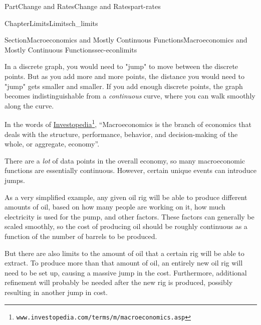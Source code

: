\documentclass[oneside,10pt,]{tufte-book}
\numberwithin{equation}{chapter}
\begin{document}
\begin{partptx}{Part}{Change and Rates}{}{Change and Rates}{}{}{part-rates}
\begin{chapterptx}{Chapter}{Limits}{}{Limits}{}{}{ch_limits}
\begin{sectionptx}{Section}{Macroeconomics and Mostly Continuous Functions}{}{Macroeconomics and Mostly Continuous Functions}{}{}{sec-econlimits}
\begin{image}{0}{1}{0}{}
{
\qquad

}%
\end{image}%
 In a discrete graph, you would need to "jump" to move between the discrete points. But as you add more and more points, the distance you would need to "jump" gets smaller and smaller. If you add enough discrete points, the graph becomes indistinguishable from a \emph{continuous} curve, where you can walk smoothly along the curve.%
\par
In the words of \href{https://www.investopedia.com/terms/m/macroeconomics.asp}{Investopedia}\footnote{\nolinkurl{www.investopedia.com/terms/m/macroeconomics.asp}\label{sec-econlimits-3-2}}, ``Macroeconomics is the branch of economics that deals with the structure, performance, behavior, and decision-making of the whole, or aggregate, economy''.%
\par
There are a \emph{lot} of data points in the overall economy, so many macroeconomic functions are essentially continuous. However, certain unique events can introduce jumps.%
\par
As a very simplified example, any given oil rig will be able to produce different amounts of oil, based on how many people are working on it, how much electricity is used for the pump, and other factors. These factors can generally be scaled smoothly, so the cost of producing oil should be roughly continuous as a function of the number of barrels to be produced.%
\par
But there are also limits to the amount of oil that a certain rig will be able to extract.  To produce more than that amount of oil, an entirely new oil rig will need to be set up, causing a massive jump in the cost. Furthermore, additional refinement will probably be needed after the new rig is produced, possibly resulting in another jump in cost.%

\end{sectionptx}
\end{chapterptx}
\end{partptx}
\end{document}
